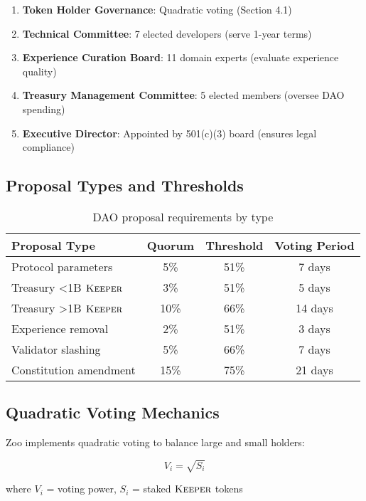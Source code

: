 \documentclass[11pt,letterpaper]{article}
\theoremstyle{definition}
\theoremstyle{remark}
\newcommand{\KEEPER}{\textsc{Keeper}}
\begin{document}
\begin{enumerate}
\item \textbf{Token Holder Governance}: Quadratic voting (Section 4.1)
\item \textbf{Technical Committee}: 7 elected developers (serve 1-year terms)
\item \textbf{Experience Curation Board}: 11 domain experts (evaluate experience quality)
\item \textbf{Treasury Management Committee}: 5 elected members (oversee DAO spending)
\item \textbf{Executive Director}: Appointed by 501(c)(3) board (ensures legal compliance)
\end{enumerate}

\subsection{Proposal Types and Thresholds}

\begin{table}[h]
\centering
\begin{tabular}{lccc}
\toprule
\textbf{Proposal Type} & \textbf{Quorum} & \textbf{Threshold} & \textbf{Voting Period} \\
\midrule
Protocol parameters & 5\% & 51\% & 7 days \\
Treasury <1B $\KEEPER$ & 3\% & 51\% & 5 days \\
Treasury >1B $\KEEPER$ & 10\% & 66\% & 14 days \\
Experience removal & 2\% & 51\% & 3 days \\
Validator slashing & 5\% & 66\% & 7 days \\
Constitution amendment & 15\% & 75\% & 21 days \\
\bottomrule
\end{tabular}
\caption{DAO proposal requirements by type}
\label{tab:dao_proposals}
\end{table}

\subsection{Quadratic Voting Mechanics}

Zoo implements quadratic voting to balance large and small holders:

\begin{equation}
V_i = \sqrt{S_i}
\end{equation}

where $V_i$ = voting power, $S_i$ = staked $\KEEPER$ tokens
\end{document}
